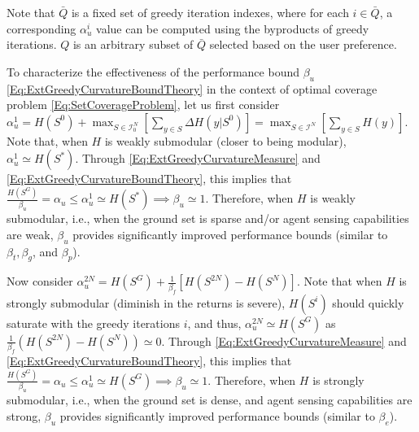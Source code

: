 \documentclass[letterpaper, 10 pt, conference]{ieeeconf}
\begin{document}
Note that $\bar{Q}$ is a fixed set of greedy iteration indexes, where for each $i\in \bar{Q}$, a corresponding $\alpha^i_u$ value can be computed using the byproducts of greedy iterations. $Q$ is an arbitrary subset of $\bar{Q}$ selected based on the user preference. 




To characterize the effectiveness of the performance bound $\beta_u$ \eqref{Eq:ExtGreedyCurvatureBoundTheory} in the context of optimal coverage problem \eqref{Eq:SetCoverageProblem}, let us first consider $\alpha_u^1 =
H(S^{0}) + \max_{S\in\mathcal{I}^N_{0}} \left[ \sum_{y\in S} \Delta H(y \vert S^{0})\right] = \max_{S\in\mathcal{I}^N} \left[ \sum_{y\in S} H(y)\right]$.  
Note that, when $H$ is weakly submodular (closer to being modular), $\alpha_u^1 \simeq H(S^*)$. Through \eqref{Eq:ExtGreedyCurvatureMeasure} and \eqref{Eq:ExtGreedyCurvatureBoundTheory}, this implies that $\frac{H(S^G)}{\beta_u} = \alpha_u  \leq \alpha_u^1 \simeq H(S^*) \implies \beta_u \simeq 1$. Therefore, when $H$ is weakly submodular, i.e., when the ground set is sparse and/or agent sensing capabilities are weak, $\beta_u$ provides significantly improved performance bounds (similar to $\beta_t,\beta_g$, and $\beta_p$).


Now consider $\alpha_u^{2N} = H(S^G) + \frac{1}{\beta_f}\left[H(S^{2N})-H(S^{N})\right]$.
Note that when $H$ is strongly submodular (diminish in the returns is severe), $H(S^i)$ should quickly saturate with the greedy iterations $i$, and thus, $\alpha_u^{2N}\simeq H(S^G)$ as $\frac{1}{\beta_f}(H(S^{2N})-H(S^{N}))\simeq 0$. Through \eqref{Eq:ExtGreedyCurvatureMeasure} and \eqref{Eq:ExtGreedyCurvatureBoundTheory}, this implies that $\frac{H(S^G)}{\beta_u} = \alpha_u  \leq \alpha_u^1 \simeq H(S^G) \implies \beta_u \simeq 1$. Therefore, when $H$ is strongly submodular, i.e., when the ground set is dense, and agent sensing capabilities are strong, $\beta_u$ provides significantly improved performance bounds (similar to $\beta_e$). 
\end{document}

